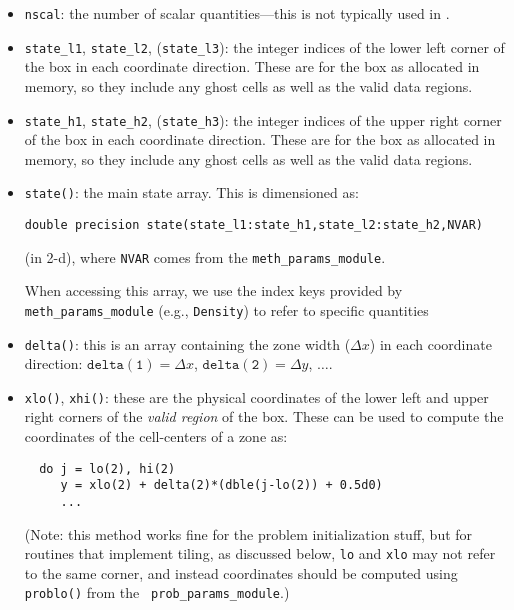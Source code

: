 \begin{itemize}
\begin{itemize}
\begin{itemize}
    \item {\tt nscal}: the number of scalar quantities---this is not typically
      used in \iamr.

    \item {\tt state\_l1}, {\tt state\_l2}, ({\tt state\_l3}): the
      integer indices of the lower left corner of the box in each
      coordinate direction.  These are for the box as allocated in memory,
      so they include any ghost cells as well as the valid data regions.

    \item {\tt state\_h1}, {\tt state\_h2}, ({\tt state\_h3}): the
      integer indices of the upper right corner of the box in each
      coordinate direction.  These are for the box as allocated in memory,
      so they include any ghost cells as well as the valid data regions.
      
    \item {\tt state()}: the main state array.  This is dimensioned as:
\begin{verbatim}
double precision state(state_l1:state_h1,state_l2:state_h2,NVAR)
\end{verbatim}
    (in 2-d), where {\tt NVAR} comes from the {\tt meth\_params\_module}.

    When accessing this array, we use the index keys provided by
    {\tt meth\_params\_module} (e.g., {\tt Density}) to refer to specific
    quantities
    
    \item {\tt delta()}: this is an array containing the zone width ($\Delta x$)
      in each coordinate direction: $\mathtt{delta(1)} = \Delta x$,
      $\mathtt{delta(2)} = \Delta y$, $\ldots$.

    \item {\tt xlo()}, {\tt xhi()}: these are the physical coordinates of the
      lower left and upper right corners of the {\em valid region}
      of the box.  These can be used to compute the coordinates of the
      cell-centers of a zone as:
\begin{lstlisting}
  do j = lo(2), hi(2)
     y = xlo(2) + delta(2)*(dble(j-lo(2)) + 0.5d0)
     ...
\end{lstlisting}
     (Note: this method works fine for the problem initialization
     stuff, but for routines that implement tiling, as discussed below,
     {\tt lo} and {\tt xlo} may not refer to the same corner, and instead
     coordinates should be computed using {\tt problo()} from the {\tt
     prob\_params\_module}.)
     

\end{itemize}
\end{itemize}
\end{itemize}
